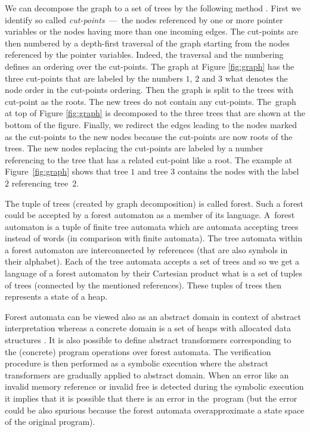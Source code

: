 \documentclass[fleqn,11pt]{ExcelAtFIT} %
\begin{document}
We can decompose the graph to a set of trees by the following method \cite{forester11}.
First we identify so called \emph{cut-points} \,---\, the nodes referenced by
one or more pointer variables or the nodes having more than one incoming edges.
The cut-points are then numbered by a depth-first traversal of the graph starting from
the nodes referenced by the pointer variables.
Indeed, the traversal and the numbering defines an ordering over the cut-points.
The graph at Figure \ref{fig:graph} has the three cut-points that are labeled by the numbers $1$,
$2$ and $3$ what denotes the node order in the cut-points ordering.
Then the graph is split to the trees with cut-point as the roots.
The new trees do not contain any cut-points.
The~graph at top of Figure \ref{fig:graph} is decomposed to the three trees that are shown at the bottom of the figure.
Finally, we redirect the edges leading to the nodes marked as the cut-points to the new nodes because the cut-points are now roots of the trees.
The new nodes replacing the cut-points are labeled by a number referencing to the tree that has a related cut-point like a root.
The example at Figure~\ref{fig:graph} shows that tree $1$ and tree $3$ contains the nodes with the label $\overline{2}$
referencing tree~$2$.

The tuple of trees (created by graph decomposition) is called forest.
Such a forest could be accepted by a forest automaton as a member of its language.
A~forest automaton is a tuple of finite tree automata which are automata accepting trees instead of words (in comparison with finite automata).
The tree automata within a forest automaton are interconnected by references (that are also symbols in their alphabet).
Each of the tree automata accepts a set of trees and so we get a language of a forest
automaton by their Cartesian product what is a set of tuples of trees (connected by the mentioned references).
These tuples of trees then represents a state of a heap. %

Forest automata can be viewed also as an abstract domain in context of abstract interpretation
whereas a concrete domain is a set of heaps with allocated data structures \cite{atva13}.
It is also possible to define abstract transformers corresponding to the (concrete) program operations over forest automata.
The verification procedure is then performed as a symbolic execution
where the abstract transformers are gradually applied to abstract domain.
When an error like an invalid memory reference or invalid free is detected during the symbolic
execution it implies that it is possible that there is an error in the~program (but the error could be also spurious because
the forest automata overapproximate a state space of the original program).
\end{document}
